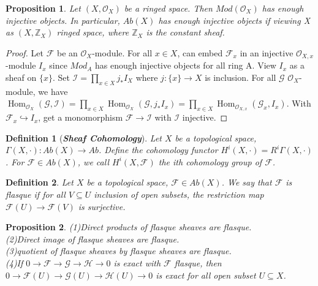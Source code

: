 \documentclass{ctexart}
\newtheorem{definition}{Definition}[section]
\newtheorem{proposition}{Proposition}[section]
\renewcommand{\hom}{\operatorname{Hom}}
\begin{document}
\begin{proposition}
    Let $(X, \mathcal{O}_{X})$ be a ringed space.
    Then $Mod(\mathcal{O}_{X})$ has enough injective objects.
    In particular, $Ab(X)$ has enough injective objects if viewing X as $(X, \mathbb{Z}_{X})$ ringed space, where $\mathbb{Z}_{X}$ is the constant sheaf.
    \label{Proposition 7.2}
\end{proposition}
\begin{proof}
    Let $\mathcal{F}$ be an $\mathcal{O}_{X}$-module.
    For all $x\in X$, can embed $\mathcal{F}_{x}$ in an injective $\mathcal{O}_{X, x}$-module $I_{x}$ since $Mod_{A}$ has enough injective objects for all ring A.
    View $I_{x}$ as a sheaf on $\{x\}$.
    Set $\mathcal{I} = \prod_{x\in X} j_{\ast}I_{X}$ where $j: \{x\} \longrightarrow X$ is inclusion.
    For all $\mathcal{G}$ $\mathcal{O}_{X}$-module, we have $\hom_{\mathcal{O}_{X}}(\mathcal{G}, \mathcal{I}) = \prod_{x\in X} \hom_{\mathcal{O}_{X}}(\mathcal{G}, j_{\ast}I_{x}) = \prod_{x\in X} \hom_{\mathcal{O}_{X, x}}(\mathcal{G}_{x}, I_{x})$.
    With $\mathcal{F}_{x} \hookrightarrow I_{x}$, get a monomorphism $\mathcal{F} \longrightarrow \mathcal{I}$ with $\mathcal{I}$ injective.
\end{proof}
\begin{definition}[\textbf{\emph{Sheaf Cohomology}}]
    Let $X$ be a topological space, $\Gamma(X, \cdot): Ab(X) \longrightarrow Ab$.
    Define the cohomology functor $H^{i}(X, \cdot) = R^{i}\Gamma(X, \cdot)$.
    For $\mathcal{F}\in Ab(X)$, we call $H^{i}(X, \mathcal{F})$ the ith cohomology group of $\mathcal{F}$.
\end{definition}
\begin{definition}
    Let $X$ be a topological space, $\mathcal{F}\in Ab(X)$.
    We say that $\mathcal{F}$ is flasque if for all $V \subseteq U$ inclusion of open subsets,
    the restriction map $\mathcal{F}(U) \longrightarrow \mathcal{F}(V)$ is surjective.
\end{definition}
\begin{proposition}
    (1)Direct products of flasque sheaves are flasque. \\
    (2)Direct image of flasque sheaves are flasque. \\
    (3)quotient of flasque sheaves by flasque sheaves are flasque. \\
    (4)If $0 \longrightarrow \mathcal{F} \longrightarrow \mathcal{G} \longrightarrow \mathcal{H} \longrightarrow 0$ is exact with $\mathcal{F}$ flasque,
    then $0 \longrightarrow \mathcal{F}(U) \longrightarrow \mathcal{G}(U) \longrightarrow \mathcal{H}(U) \longrightarrow 0$ is exact for all open subset $U \subseteq X$.
    \label{Proposition 7.3}
\end{proposition}
\end{document}
